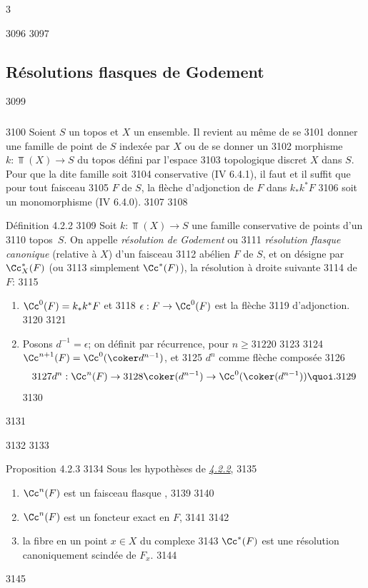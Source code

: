 3	\documentclass[10pt]{../fichiers-configuration-latex/smfart}
\begin{document}
  3096	
  3097	\subsection{Résolutions flasques de Godement}	
  3099	\subsubsection{}
  3100	Soient $S$ un topos et $X$ un ensemble. Il revient au même de se
  3101	donner une famille de point de $S$ indexée par $X$ ou de se donner un
  3102	morphisme $k:\Top(X)\rightarrow S$ du topos défini par l'espace
  3103	topologique discret $X$ dans $S$. Pour que la dite famille soit
  3104	conservative (IV 6.4.1), il faut et il suffit que pour tout faisceau
  3105	$F$ de $S$, la flèche d'adjonction de $F$ dans $k_{\ast}k^{\ast}F$
  3106	soit un monomorphisme (\cf IV 6.4.0).
  3107	
  3108	\begin{enonce*}{Définition 4.2.2}
  3109	Soit $k:\Top(X)\rightarrow S$ une famille conservative de points d'un
  3110	topos~$S$. On appelle \emph{résolution de Godement} ou
  3111	\emph{résolution flasque canonique} (relative à $X$) d'un faisceau
  3112	abélien $F$ de $S$, et on désigne par $\Cc^{\ast}_X(F)$ (ou
  3113	simplement $\Cc^{\ast}(F)$), la résolution à droite suivante
  3114	de $F$:
  3115	\begin{enumerate}
  3116	\renewcommand{\labelenumi}{\theenumi)}
  3117	\item $\Cc^{0}(F)=k_{\ast}k^{\ast}F$ et
  3118	$\epsilon:F\rightarrow \Cc^{0}(F)$ est la flèche
  3119	d'adjonction.
  3120	
  3121	\item Posons $d^{-1}=\epsilon$; on définit par récurrence, pour $n\geq
  3122	0$
  3123	
  3124	$\Cc^{n+1}(F)=\Cc^{0}(\coker d^{n-1})$, et
  3125	$d^{n}$ comme flèche composée
  3126	\[
  3127	d^{n}:\Cc^n(F)\rightarrow
  3128	\coker(d^{n-1})\rightarrow \Cc^{0}(\coker(d^{n-1})){\quoi}.
  3129	\]
  3130	\end{enumerate}
  3131	\end{enonce*}
  3132	
  3133	\begin{enonce*}{Proposition 4.2.3}
  3134	Sous les hypothèses de \emph{\hyperref[XVII.def4.2.2]{4.2.2}},
  3135	\begin{enumerate}
  3136	\renewcommand{\theenumi}{\roman{enumi}}
  3137	\renewcommand{\labelenumi}{(\theenumi)}
  3138	\item $\Cc^n(F)$ est un faisceau flasque \emph{},
  3139	
  3140	\item $\Cc^{n}(F)$ est un foncteur exact en $F$,
  3141	
  3142	\item la fibre en un point $x\in X$ du complexe
  3143	$\Cc^{\ast}(F)$ est une résolution canoniquement scindée de $F_x$.
  3144	\end{enumerate}
  3145	\end{enonce*}
\end{document}
